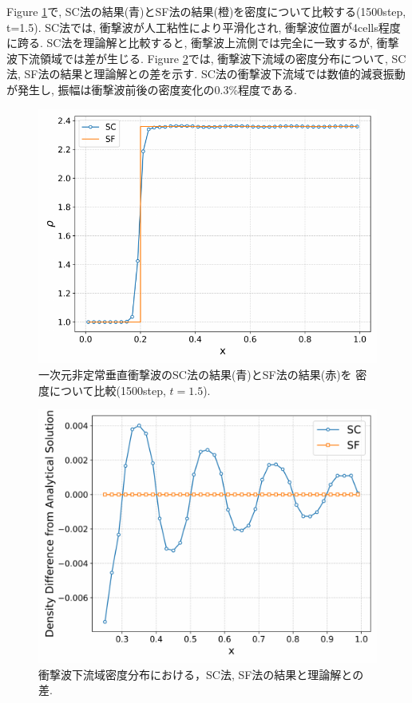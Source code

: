 \documentclass[a4j]{jarticle}
\begin{document}
Figure \ref{fig:1Dscsfa}で, SC法の結果(青)とSF法の結果(橙)を密度について比較する(1500step, t=1.5).
SC法では, 衝撃波が人工粘性により平滑化され, 衝撃波位置が4cells程度に跨る.
SC法を理論解と比較すると, 衝撃波上流側では完全に一致するが, 衝撃波下流領域では差が生じる.
Figure \ref{fig:1Dscsfb}では, 衝撃波下流域の密度分布について, SC法, SF法の結果と理論解との差を示す.
SC法の衝撃波下流域では数値的減衰振動が発生し, 
振幅は衝撃波前後の密度変化の0.3\%程度である.
\begin{figure}[h]
  \centering
  \includegraphics[width=\linewidth]{1Dscsfa.pdf}
  \caption{%
    一次元非定常垂直衝撃波のSC法の結果(青)とSF法の結果(赤)を
    密度について比較(1500step, $t=1.5$).
  }
  \label{fig:1Dscsfa}
\end{figure}
\begin{figure}[h]
  \centering
  \includegraphics[width=\linewidth]{1Dscsfb.pdf}
  \caption{%
    衝撃波下流域密度分布における，SC法, SF法の結果と理論解との差.
  }
  \label{fig:1Dscsfb}
\end{figure}
\end{document}
